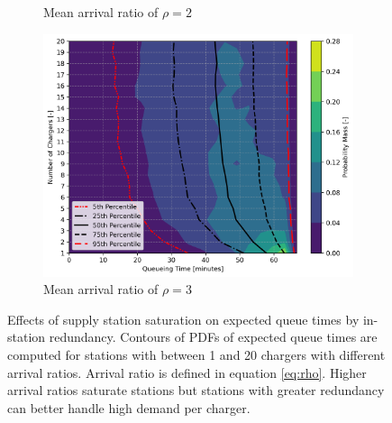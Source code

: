 \documentclass[11pt]{article}
\begin{document}
\begin{figure}[H]
\begin{subfigure}{.33\linewidth}
		\caption{Mean arrival ratio of $\rho = 2$}
	\end{subfigure}%
	\begin{subfigure}{.33\linewidth}
		\centering
		\includegraphics[width = \linewidth]{figs/expected_delay_contourf_3.png}
		\caption{Mean arrival ratio of $\rho = 3$}
	\end{subfigure}
	
	\caption{Effects of supply station saturation on expected queue times by in-station redundancy. Contours of PDFs of expected queue times are computed for stations with between 1 and 20 chargers with different arrival ratios. Arrival ratio is defined in equation \eqref{eq:rho}. Higher arrival ratios saturate stations but stations with greater redundancy can better handle high demand per charger.}
	\label{fig:expected_delay}
	
\end{figure}
\end{document}
